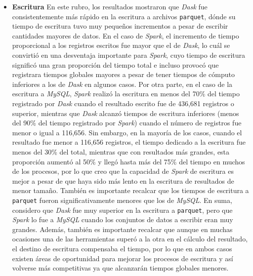 \begin{itemize}
	\item \textbf{Escritura} En este rubro, los resultados mostraron que \textit{Dask} fue consistentemente más rápido en la escritura a archivos \texttt{parquet}, dónde su tiempo de escritura tuvo muy pequeños incrementos a pesar de escribir cantidades mayores de datos. En el caso de \textit{Spark}, el incremento de tiempo proporcional a los registros escritos fue mayor que el de \textit{Dask}, lo cuál se convirtió en una desventaja importante para \textit{Spark}, cuyo tiempo de escritura significó una gran proporción del tiempo total e incluso provocó que registrara tiempos globales mayores a pesar de tener tiempos de cómputo inferiores a los de \textit{Dask} en algunos casos. Por otra parte, en el caso de la escritura a \textit{MySQL}, \textit{Spark} realizó la escritura en menos del 70\% del tiempo registrado por \textit{Dask} cuando el resultado escrito fue de 436,681 registros o superior, mientras que \textit{Dask} alcanzó tiempos de escritura inferiores (menos del 90\% del tiempo registrado por \textit{Spark}) cuando el número de registros fue menor o igual a 116,656. Sin embargo, en la mayoría de los casos, cuando el resultado fue menor a 116,656 registros, el tiempo dedicado a la escritura fue menos del 30\% del total, mientras que con resultados más grandes, esta proporción aumentó al 50\% y llegó hasta más del 75\% del tiempo en muchos de los procesos, por lo que creo que la capacidad de \textit{Spark} de escritura es mejor a pesar de que haya sido más lento en la escritura de resultados de menor tamaño. También es importante recalcar que los tiempos de escritura a \texttt{parquet} fueron significativamente menores que los de \textit{MySQL}. En suma, considero que \textit{Dask} fue muy superior en la escritura a \texttt{parquet}, pero que \textit{Spark} lo fue a \textit{MySQL} cuando los conjuntos de datos a escribir eran muy grandes. Además, también es importante recalcar que aunque en muchas ocasiones una de las herramientas superó a la otra en el cálculo del resultado, el destino de escritura compensaba el tiempo, por lo que en ambos casos existen áreas de oportunidad para mejorar los procesos de escritura y así volverse más competitivas ya que alcanzarán tiempos globales menores. 
		

\end{itemize}
